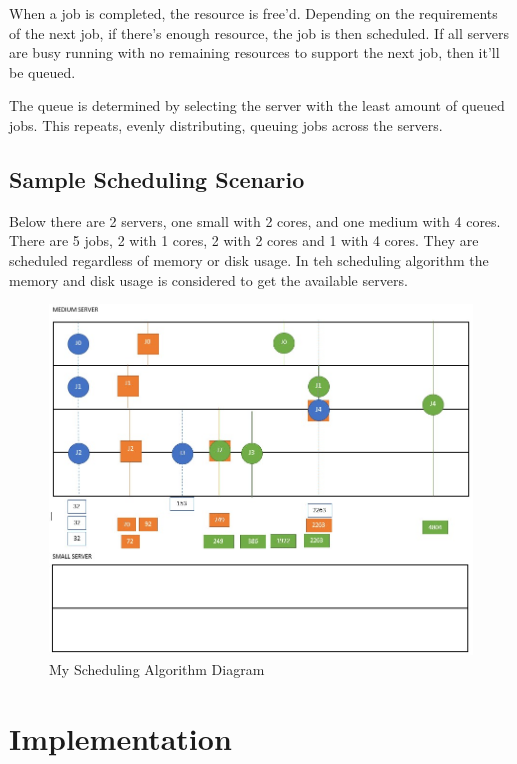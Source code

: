 \documentclass[a4paper]{article} %
\begin{document}
When a job is completed, the resource is free’d. Depending on the requirements of the next job, if there’s enough resource, the job is then scheduled. If all servers are busy running with no remaining resources to support the next job, then it’ll be queued.

\medskip
The queue is determined by selecting the server with the least amount of queued jobs. This repeats, evenly distributing, queuing jobs across the servers.

\subsection*{Sample Scheduling Scenario}
Below there are 2 servers, one small with 2 cores, and one medium with 4 cores. There are 5 jobs, 2 with 1 cores, 2 with 2 cores and 1 with 4 cores. They are scheduled regardless of memory or disk usage. In teh scheduling algorithm the memory and disk usage is considered to get the available servers.

\begin{figure}[!h]
    \centering
    \includegraphics[width=17cm]{images/MySchedulingDiagram.jpg}
    \caption{My Scheduling Algorithm Diagram}
    \label{fig:my_label}
\end{figure}

\break
\section{Implementation}
\end{document}
